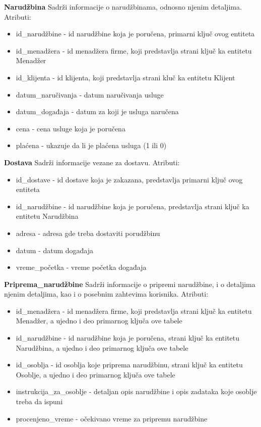 \documentclass[a4paper]{article}
\begin{document}
\textbf{Narudžbina} Sadrži informacije o narudžbinama, odnosno njenim detaljima. Atributi:
\begin{itemize}
    \item id\_narudžbine - id narudžbine koja je poručena, primarni ključ ovog entiteta
    \item id\_menadžera - id menadžera firme, koji predstavlja strani ključ ka entitetu Menadžer
    \item id\_klijenta - id klijenta, koji predstavlja strani kluč ka entitetu Klijent
    \item datum\_naručivanja - datum naručivanja usluge
    \item datum\_događaja - datum za koji je usluga naručena
    \item cena - cena usluge koja je poručena
    \item plaćena - ukazuje da li je plaćena usluga (1 ili 0)
    
\end{itemize}

\vspace{3mm}



\textbf{Dostava} Sadrži informacije vezane za dostavu. Atributi:
\begin{itemize}
    \item id\_dostave - id dostave koja je zakazana, predstavlja primarni ključ ovog entiteta
    \item id\_narudžbine - id narudžbine koja je poručena, predstavlja strani ključ ka entitetu Narudžbina
    \item adresa - adresa gde treba dostaviti porudžbinu
    \item datum - datum događaja
    \item vreme\_početka - vreme početka događaja
    
\end{itemize}

\vspace{3mm}

\textbf{Priprema\_narudžbine} Sadrži informacije o pripremi narudžbine, i o detaljima njenim detaljima, kao i o posebnim zahtevima korisnika. Atributi:
\begin{itemize}
    \item id\_menadžera - id menadžera firme, koji predstavlja strani ključ ka entitetu Menadžer, a ujedno i deo primarnog ključa ove tabele
    \item id\_narudžbine - id narudžbine koja je poručena, strani ključ ka entitetu Narudžbina, a ujedno i deo primarnog ključa ove tabele
    \item id\_osoblja - id osoblja koje priprema narudžbinu, strani ključ ka entitetu Osoblje, a ujedno i deo primarnog ključa ove tabele
    \item instrukcija\_za\_osoblje - detaljan opis narudžbine i opis zadataka koje osoblje treba da ispuni
    \item procenjeno\_vreme - očekivano vreme za pripremu narudžbine
    
\end{itemize}
\end{document}
